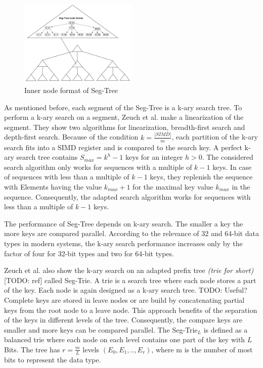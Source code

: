 \documentclass[conference]{IEEEtran}
\begin{document}
\begin{figure}
	\includegraphics[width=0.5\textwidth]{figure_2.png}
	\caption{Inner node format of Seg-Tree}
	\label{fig}
\end{figure}

As mentioned before, each segment of the Seg-Tree is a k-ary search tree. To perform a k-ary search on a segment, Zeuch et al. make a linearization of the segment. They show two algorithms for linearization, breadth-first search and depth-first search. Because of the condition $k = \frac{\vert SIMD \vert }{m}$, each partition of the k-ary search fits into a SIMD register and is compared to the search key. A perfect k-ary search tree contains  $S_{max} = k^h - 1$ keys for an integer $h > 0$. The considered search algorithm only works for sequences with a multiple of $k-1$ keys. In case of  sequences with less than a multiple of $k-1$ keys, they replenish the sequence with Elements having the value $k_{max} + 1$ for the maximal key value $k_{max}$ in the sequence. Consequently, the adapted search algorithm works for sequences with less than a multiple of $k-1$ keys.

The performance of Seg-Tree depends on k-ary search. The smaller a key the more keys are compared parallel. According to the relevance of 32 and 64-bit data types in modern systems, the k-ary search performance increases only by the factor of four for 32-bit types and two for 64-bit types.

Zeuch et al. also show the k-ary search on an adapted prefix tree \emph{(trie for short)} [TODO: ref] called Seg-Trie. A trie is a search tree where each node stores a part of the key. Each node is again designed as a k-ary search tree. TODO: Useful? Complete keys are stored in leave nodes or are build by concatenating partial keys from the root node to a leave node. This approach benefits of the separation of the keys in different levels of the tree. Consequently, the compare keys are smaller and more keys can be compared parallel. The Seg-Trie$_L$ is defined as a balanced trie where each node on each level contains one part of the key with $L$ Bits. The tree has $r = \frac{m}{L}$ levels $(E_0, E_1, .., E_r)$, where m is the number of most bits to represent the data type.
\end{document}
